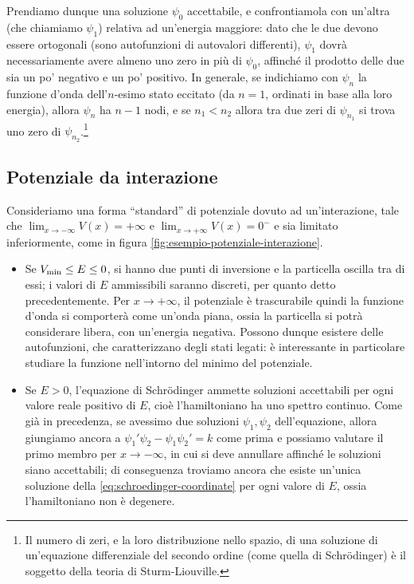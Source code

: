 Prendiamo dunque una soluzione $\psi_0$ accettabile, e confrontiamola con un'altra (che chiamiamo $\psi_1$) relativa ad un'energia maggiore: dato che le due devono essere ortogonali (sono autofunzioni di autovalori differenti), $\psi_1$ dovrà necessariamente avere almeno uno zero in più di $\psi_0$, affinch\'e il prodotto delle due sia un po' negativo e un po' positivo.
In generale, se indichiamo con $\psi_n$ la funzione d'onda dell'$n$-esimo stato eccitato (da $n=1$, ordinati in base alla loro energia), allora $\psi_n$ ha $n-1$ nodi, e se $n_1<n_2$ allora tra due zeri di $\psi_{n_1}$ si trova uno zero di $\psi_{n_2}$.\footnote{Il numero di zeri, e la loro distribuzione nello spazio, di una soluzione di un'equazione differenziale del secondo ordine (come quella di Schr\"odinger) è il soggetto della teoria di Sturm-Liouville.}

\subsection{Potenziale da interazione}
Consideriamo una forma ``standard'' di potenziale dovuto ad un'interazione, tale che $\lim_{x\to-\infty}V(x)=+\infty$ e $\lim_{x\to+\infty}V(x)=0^-$ e sia limitato inferiormente, come in figura \ref{fig:esempio-potenziale-interazione}.

\begin{itemize}
	\item Se $V_\textup{min}\le E\le0$, si hanno due punti di inversione e la particella oscilla tra di essi; i valori di $E$ ammissibili saranno discreti, per quanto detto precedentemente.
		Per $x\to+\infty$, il potenziale è trascurabile quindi la funzione d'onda si comporterà come un'onda piana, ossia la particella si potrà considerare libera, con un'energia negativa.
		Possono dunque esistere delle autofunzioni, che caratterizzano degli stati legati: è interessante in particolare studiare la funzione nell'intorno del minimo del potenziale.
	\item Se $E>0$, l'equazione di Schr\"odinger ammette soluzioni accettabili per ogni valore reale positivo di $E$, cioè l'hamiltoniano ha uno spettro continuo.
		Come già in precedenza, se avessimo due soluzioni $\psi_1,\psi_2$ dell'equazione, allora giungiamo ancora a $\psi_1'\psi_2-\psi_1\psi_2'=k$ come prima e possiamo valutare il primo membro per $x\to-\infty$, in cui si deve annullare affinch\'e le soluzioni siano accettabili; di conseguenza troviamo ancora che esiste un'unica soluzione della \eqref{eq:schroedinger-coordinate} per ogni valore di $E$, ossia l'hamiltoniano non è degenere.
\end{itemize}

